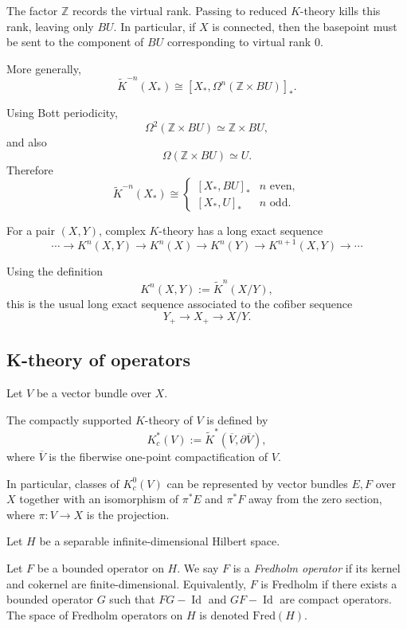\documentclass[12pt]{article}
\DeclareMathOperator{\Id}{Id}
\begin{document}
The factor \(\mathbb Z\) records the virtual rank. Passing to reduced \(K\)-theory kills this rank, leaving only \(BU\). In particular, if $X$ is connected, then the basepoint must be sent to the component of $BU$ corresponding to virtual rank $0$.

More generally,
\[
\widetilde K^{-n}(X_*) \cong [X_*,\Omega^n(\mathbb Z\times BU)]_*.
\]

Using Bott periodicity,
\[
\Omega^2(\mathbb Z\times BU) \simeq \mathbb Z\times BU,
\]
and also
\[
\Omega(\mathbb Z\times BU)\simeq U.
\]
Therefore
\[
\widetilde K^{-n}(X_*) \cong
\begin{cases}
[X_*,BU]_* & n \text{ even},\\
[X_*,U]_* & n \text{ odd}.
\end{cases}
\]

\begin{theorem}
For a pair \((X,Y)\), complex \(K\)-theory has a long exact sequence
\[
\cdots \to K^n(X,Y)
\to K^n(X)
\to K^n(Y)
\to K^{n+1}(X,Y)
\to \cdots
\]
\end{theorem}
Using the definition
\[
K^n(X,Y) := \widetilde K^n(X/Y),
\]
this is the usual long exact sequence associated to the cofiber sequence
\[
Y_+ \to X_+ \to X/Y.
\] 

\subsection{K-theory of operators}
Let $V$ be a vector bundle over $X$.
\begin{definition}
The compactly supported \(K\)-theory of \(V\) is defined by
\[K^*_c(V) := \widetilde K^*(\overline{V},\partial \overline{V}),\]
where \(\overline{V}\) is the fiberwise one-point compactification of \(V\).
\end{definition} 
In particular, classes of $K^0_c(V)$ can be represented by vector bundles $E,F$ over $X$ together with an isomorphism of $\pi^*E$ and $\pi^*F$ away from the zero section, where $\pi:V \to X$ is the projection.

Let $H$ be a separable infinite-dimensional Hilbert space.

\begin{definition} Let $F$ be a bounded operator on $H$. We say $F$ is a \textit{Fredholm operator} if its kernel and cokernel are finite-dimensional. Equivalently, $F$ is Fredholm if there exists a bounded operator $G$ such that $FG - \Id$ and $GF - \Id$ are compact operators.
    The space of Fredholm operators on $H$ is denoted $\mathrm{Fred}(H)$.
\end{definition}
\end{document}
